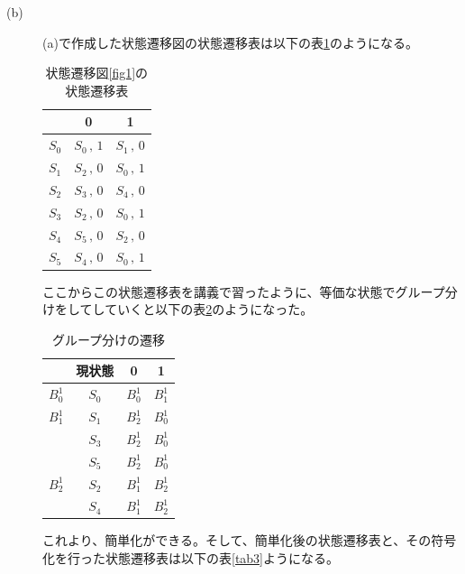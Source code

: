 \documentclass{jsarticle}
\begin{document}
\begin{description}
\begin{description}
            \item[(b)]
            (a)で作成した状態遷移図の状態遷移表は以下の表\ref{tab1}のようになる。
            \begin{table}[H]
                \centering
                \caption{状態遷移図\ref{fig1}の状態遷移表}
                \label{tab1}
                \begin{tabular}{|c|c|c|} \hline
                    & 0 & 1 \\ \hline
                    $S_0$ & $S_0 \,,\, 1$ & $S_1 \,,\, 0$ \\ \hline
                    $S_1$ & $S_2 \,,\, 0$ & $S_0 \,,\, 1$ \\ \hline
                    $S_2$ & $S_3 \,,\, 0$ & $S_4 \,,\, 0$ \\ \hline
                    $S_3$ & $S_2 \,,\, 0$ & $S_0 \,,\, 1$ \\ \hline
                    $S_4$ & $S_5 \,,\, 0$ & $S_2 \,,\, 0$ \\ \hline
                    $S_5$ & $S_4 \,,\, 0$ & $S_0 \,,\, 1$ \\ \hline
                \end{tabular}
            \end{table}
            ここからこの状態遷移表を講義で習ったように、等価な状態でグループ分けをしてしていくと以下の表\ref{tab2}のようになった。
            \begin{table}[H]
                \centering
                \caption{グループ分けの遷移}
                \label{tab2}
                \begin{tabular}{|c|c|c|c|} \hline
                    & 現状態 & 0 & 1 \\ \hline
                    $B_0^1$ & $S_0$ & $B_0^1$ & $B_1^1$ \\ \hline
                    $B_1^1$ & $S_1$ & $B_2^1$ & $B_0^1$ \\ \cline{2-4}
                     & $S_3$ & $B_2^1$ & $B_0^1$ \\ \cline{2-4}
                     & $S_5$ & $B_2^1$ & $B_0^1$ \\ \hline
                    $B_2^1$ & $S_2$ & $B_1^1$ & $B_2^1$ \\ \cline{2-4}
                     & $S_4$ & $B_1^1$ & $B_2^1$ \\ \hline
                \end{tabular}
            \end{table}
            これより、簡単化ができる。そして、簡単化後の状態遷移表と、その符号化を行った状態遷移表は以下の表\ref{tab3}ようになる。

\end{description}
\end{description}
\end{document}
